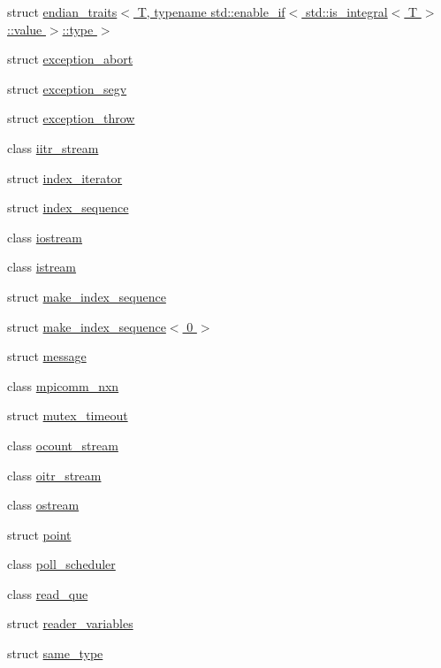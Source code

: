 \begin{DoxyCompactItemize}
\item 
struct \hyperlink{structmui_1_1endian__traits_3_01_t_00_01typename_01std_1_1enable__if_3_01std_1_1is__integral_3_017f2a9fc75456eff64bb43276e6e0ef4}{endian\+\_\+traits$<$ T, typename std\+::enable\+\_\+if$<$ std\+::is\+\_\+integral$<$ T $>$\+::value $>$\+::type $>$}
\item 
struct \hyperlink{structmui_1_1exception__abort}{exception\+\_\+abort}
\item 
struct \hyperlink{structmui_1_1exception__segv}{exception\+\_\+segv}
\item 
struct \hyperlink{structmui_1_1exception__throw}{exception\+\_\+throw}
\item 
class \hyperlink{classmui_1_1iitr__stream}{iitr\+\_\+stream}
\item 
struct \hyperlink{structmui_1_1index__iterator}{index\+\_\+iterator}
\item 
struct \hyperlink{structmui_1_1index__sequence}{index\+\_\+sequence}
\item 
class \hyperlink{classmui_1_1iostream}{iostream}
\item 
class \hyperlink{classmui_1_1istream}{istream}
\item 
struct \hyperlink{structmui_1_1make__index__sequence}{make\+\_\+index\+\_\+sequence}
\item 
struct \hyperlink{structmui_1_1make__index__sequence_3_010_01_4}{make\+\_\+index\+\_\+sequence$<$ 0 $>$}
\item 
struct \hyperlink{structmui_1_1message}{message}
\item 
class \hyperlink{classmui_1_1mpicomm__nxn}{mpicomm\+\_\+nxn}
\item 
struct \hyperlink{structmui_1_1mutex__timeout}{mutex\+\_\+timeout}
\item 
class \hyperlink{classmui_1_1ocount__stream}{ocount\+\_\+stream}
\item 
class \hyperlink{classmui_1_1oitr__stream}{oitr\+\_\+stream}
\item 
class \hyperlink{classmui_1_1ostream}{ostream}
\item 
struct \hyperlink{structmui_1_1point}{point}
\item 
class \hyperlink{classmui_1_1poll__scheduler}{poll\+\_\+scheduler}
\item 
class \hyperlink{classmui_1_1read__que}{read\+\_\+que}
\item 
struct \hyperlink{structmui_1_1reader__variables}{reader\+\_\+variables}
\item 
struct \hyperlink{structmui_1_1same__type}{same\+\_\+type}

\end{DoxyCompactItemize}
